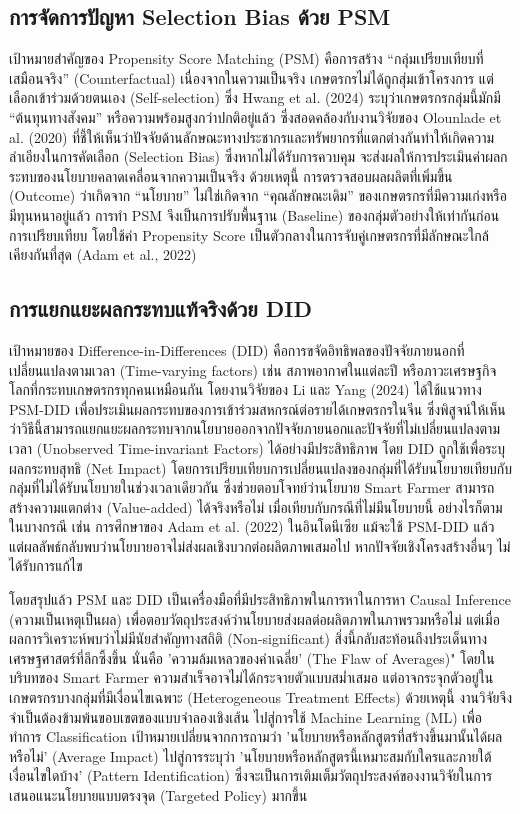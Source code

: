 \subsection{การจัดการปัญหา Selection Bias ด้วย PSM}
เป้าหมายสำคัญของ Propensity Score Matching (PSM) คือการสร้าง ``กลุ่มเปรียบเทียบที่เสมือนจริง'' (Counterfactual) เนื่องจากในความเป็นจริง เกษตรกรไม่ได้ถูกสุ่มเข้าโครงการ แต่เลือกเข้าร่วมด้วยตนเอง (Self-selection)
ซึ่ง Hwang et al. (2024) ระบุว่าเกษตรกรกลุ่มนี้มักมี ``ต้นทุนทางสังคม'' หรือความพร้อมสูงกว่าปกติอยู่แล้ว ซึ่งสอดคล้องกับงานวิจัยของ Olounlade et al. (2020) ที่ชี้ให้เห็นว่าปัจจัยด้านลักษณะทางประชากรและทรัพยากรที่แตกต่างกันทำให้เกิดความลำเอียงในการคัดเลือก (Selection Bias)
ซึ่งหากไม่ได้รับการควบคุม จะส่งผลให้การประเมินค่าผลกระทบของนโยบายคลาดเคลื่อนจากความเป็นจริง
ด้วยเหตุนี้ การตรวจสอบผลผลิตที่เพิ่มขึ้น (Outcome) ว่าเกิดจาก ``นโยบาย'' ไม่ใช่เกิดจาก ``คุณลักษณะเดิม'' ของเกษตรกรที่มีความเก่งหรือมีทุนหนาอยู่แล้ว
การทำ PSM จึงเป็นการปรับพื้นฐาน (Baseline) ของกลุ่มตัวอย่างให้เท่ากันก่อนการเปรียบเทียบ โดยใช้ค่า Propensity Score เป็นตัวกลางในการจับคู่เกษตรกรที่มีลักษณะใกล้เคียงกันที่สุด (Adam et al., 2022)

\subsection{การแยกแยะผลกระทบแท้จริงด้วย DID}
เป้าหมายของ Difference-in-Differences (DID) คือการขจัดอิทธิพลของปัจจัยภายนอกที่เปลี่ยนแปลงตามเวลา (Time-varying factors) เช่น สภาพอากาศในแต่ละปี หรือภาวะเศรษฐกิจโลกที่กระทบเกษตรกรทุกคนเหมือนกัน โดยงานวิจัยของ Li และ Yang (2024) ได้ใช้แนวทาง PSM-DID เพื่อประเมินผลกระทบของการเข้าร่วมสหกรณ์ต่อรายได้เกษตรกรในจีน ซึ่งพิสูจน์ให้เห็นว่าวิธีนี้สามารถแยกแยะผลกระทบจากนโยบายออกจากปัจจัยภายนอกและปัจจัยที่ไม่เปลี่ยนแปลงตามเวลา (Unobserved Time-invariant Factors) ได้อย่างมีประสิทธิภาพ โดย DID ถูกใช้เพื่อระบุผลกระทบสุทธิ (Net Impact) โดยการเปรียบเทียบการเปลี่ยนแปลงของกลุ่มที่ได้รับนโยบายเทียบกับกลุ่มที่ไม่ได้รับนโยบายในช่วงเวลาเดียวกัน ซึ่งช่วยตอบโจทย์ว่านโยบาย Smart Farmer สามารถสร้างความแตกต่าง (Value-added) ได้จริงหรือไม่ เมื่อเทียบกับกรณีที่ไม่มีนโยบายนี้ อย่างไรก็ตาม ในบางกรณี เช่น การศึกษาของ Adam et al. (2022) ในอินโดนีเซีย แม้จะใช้ PSM-DID แล้ว แต่ผลลัพธ์กลับพบว่านโยบายอาจไม่ส่งผลเชิงบวกต่อผลิตภาพเสมอไป หากปัจจัยเชิงโครงสร้างอื่นๆ ไม่ได้รับการแก้ไข

โดยสรุปแล้ว PSM และ DID เป็นเครื่องมือที่มีประสิทธิภาพในการหาในการหา Causal Inference (ความเป็นเหตุเป็นผล) เพื่อตอบวัตถุประสงค์ว่านโยบายส่งผลต่อผลิตภาพในภาพรวมหรือไม่ แต่เมื่อผลการวิเคราะห์พบว่าไม่มีนัยสำคัญทางสถิติ (Non-significant) สิ่งนี้กลับสะท้อนถึงประเด็นทางเศรษฐศาสตร์ที่ลึกซึ้งขึ้น นั่นคือ 'ความล้มเหลวของค่าเฉลี่ย' (The Flaw of Averages)" โดยในบริบทของ Smart Farmer ความสำเร็จอาจไม่ได้กระจายตัวแบบสม่ำเสมอ แต่อาจกระจุกตัวอยู่ในเกษตรกรบางกลุ่มที่มีเงื่อนไขเฉพาะ (Heterogeneous Treatment Effects) ด้วยเหตุนี้ งานวิจัยจึงจำเป็นต้องข้ามพ้นขอบเขตของแบบจำลองเชิงเส้น ไปสู่การใช้ Machine Learning (ML) เพื่อทำการ Classification เป้าหมายเปลี่ยนจากการถามว่า 'นโยบายหรือหลักสูตรที่สร้างขึ้นมานั้นได้ผลหรือไม่' (Average Impact) ไปสู่การระบุว่า 'นโยบายหรือหลักสูตรนี้เหมาะสมกับใครและภายใต้เงื่อนไขใดบ้าง' (Pattern Identification) ซึ่งจะเป็นการเติมเต็มวัตถุประสงค์ของงานวิจัยในการเสนอแนะนโยบายแบบตรงจุด (Targeted Policy) มากขึ้น

